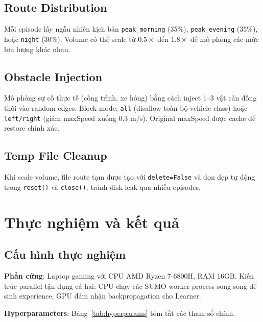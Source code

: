 \documentclass[conference]{IEEEtran}
\begin{document}
\subsection{Route Distribution}

Mỗi episode lấy ngẫu nhiên kịch bản \texttt{peak\_morning} (35\%), \texttt{peak\_evening} (35\%), hoặc \texttt{night} (30\%). Volume có thể scale từ $0.5\times$ đến $1.8\times$ để mô phỏng các mức lưu lượng khác nhau.

\subsection{Obstacle Injection}

Mô phỏng sự cố thực tế (công trình, xe hỏng) bằng cách inject 1--3 vật cản đồng thời vào random edges. Block mode: \texttt{all} (disallow toàn bộ vehicle class) hoặc \texttt{left/right} (giảm maxSpeed xuống 0.3 m/s). Original maxSpeed được cache để restore chính xác.

\subsection{Temp File Cleanup}

Khi scale volume, file route tạm được tạo với \texttt{delete=False} và dọn dẹp tự động trong \texttt{reset()} và \texttt{close()}, tránh disk leak qua nhiều episodes.

\section{Thực nghiệm và kết quả}

\subsection{Cấu hình thực nghiệm}

\textbf{Phần cứng}: Laptop gaming với CPU AMD Ryzen 7-6800H, RAM 16GB. Kiến trúc parallel tận dụng cả hai: CPU chạy các SUMO worker process song song để sinh experience, GPU đảm nhận backpropagation cho Learner.

\textbf{Hyperparameters}: Bảng~\ref{tab:hyperparams} tóm tắt các tham số chính.
\end{document}
